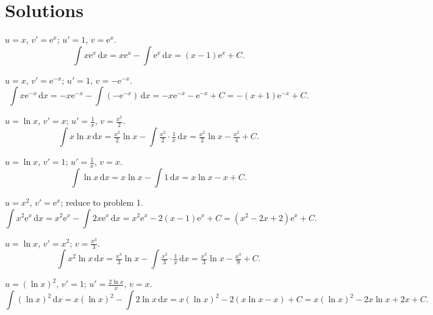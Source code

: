 \section{Solutions}

\begin{solutions}
  \item $u=x$, $v'=\mathrm{e}^{x}$; $u'=1$, $v=\mathrm{e}^{x}$.
        \[
          \int x\mathrm{e}^{x}\,\mathrm{d}x
            = x\mathrm{e}^{x}-\int \mathrm{e}^{x}\,\mathrm{d}x
            = (x-1)\mathrm{e}^{x}+C .
        \]

  \item $u=x$, $v'=\mathrm{e}^{-x}$; $u'=1$, $v=-\mathrm{e}^{-x}$.
        \[
          \int x\mathrm{e}^{-x}\,\mathrm{d}x
            = -x\mathrm{e}^{-x}-\int(-\mathrm{e}^{-x})\,\mathrm{d}x
            = -x\mathrm{e}^{-x}-\mathrm{e}^{-x}+C
            = -(x+1)\mathrm{e}^{-x}+C .
        \]

  \item $u=\ln x$, $v'=x$; $u'=\tfrac1x$, $v=\tfrac{x^{2}}{2}$.
        \[
          \int x\ln x\,\mathrm{d}x
            = \tfrac{x^{2}}{2}\ln x - \int \tfrac{x^{2}}{2}\cdot\tfrac1x\,\mathrm{d}x
            = \tfrac{x^{2}}{2}\ln x - \tfrac{x^{2}}{4}+C .
        \]

  \item $u=\ln x$, $v'=1$; $u'=\tfrac1x$, $v=x$.
        \[
          \int \ln x\,\mathrm{d}x = x\ln x - \int 1\,\mathrm{d}x = x\ln x - x + C .
        \]

  \item $u=x^{2}$, $v'=\mathrm{e}^{x}$; reduce to problem 1.
        \[
          \int x^{2}\mathrm{e}^{x}\,\mathrm{d}x
            = x^{2}\mathrm{e}^{x}-\int 2x\mathrm{e}^{x}\,\mathrm{d}x
            = x^{2}\mathrm{e}^{x}-2(x-1)\mathrm{e}^{x}+C
            = (x^{2}-2x+2)\mathrm{e}^{x}+C .
        \]

  \item $u=\ln x$, $v'=x^{2}$; $v=\tfrac{x^{3}}{3}$.
        \[
          \int x^{2}\ln x\,\mathrm{d}x
            = \tfrac{x^{3}}{3}\ln x - \int \tfrac{x^{3}}{3}\cdot\tfrac1x\,\mathrm{d}x
            = \tfrac{x^{3}}{3}\ln x - \tfrac{x^{3}}{9}+C .
        \]

  \item $u=(\ln x)^{2}$, $v'=1$; $u'=\tfrac{2\ln x}{x}$, $v=x$.
        \[
          \int (\ln x)^{2}\,\mathrm{d}x
            = x(\ln x)^{2}-\int 2\ln x\,\mathrm{d}x
            = x(\ln x)^{2}-2(x\ln x - x)+C
            = x(\ln x)^{2}-2x\ln x+2x+C .
        \]


\end{solutions}
